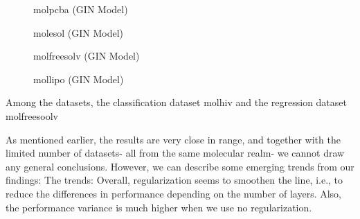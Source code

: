 \begin{figure}
    \centering
    \caption{molpcba (GIN Model)}
    \label{fig:gcn-molfreesolv}
\end{figure}

\begin{figure}
    \centering
    \caption{molesol (GIN Model)}
    \label{fig:gcn-molfreesolv}
\end{figure}

\begin{figure}
    \centering
    \caption{molfreesolv (GIN Model)}
    \label{fig:gcn-molfreesolv}
\end{figure}

\begin{figure}
    \centering
    \caption{mollipo (GIN Model)}
    \label{fig:gcn-molfreesolv}
\end{figure}



Among the datasets, the classification dataset molhiv and the regression dataset molfreesoolv

As mentioned earlier, the results are very close in range, and together with the limited number of datasets- all from the same molecular realm- we cannot draw any general conclusions. However, we can describe some emerging trends from our findings:
The trends:
Overall, regularization seems to smoothen the line, i.e., to reduce the differences in performance depending on the number of layers. Also, the performance variance is much higher when we use no regularization.



